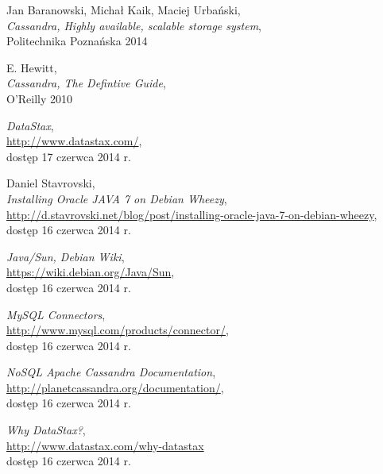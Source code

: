 \documentclass{article} %
\begin{document}
\begin{thebibliography}{10}%

Jan Baranowski, Michał Kaik, Maciej Urbański,\\
\emph{Cassandra, Highly available, scalable storage system},\\
Politechnika Poznańska 2014

E. Hewitt,\\
\emph{Cassandra, The Defintive Guide},\\
O'Reilly 2010

\emph{DataStax},\\
\url{http://www.datastax.com/},\\
dostęp 17 czerwca 2014 r.

Daniel Stavrovski,\\
\emph{Installing Oracle JAVA 7 on Debian Wheezy},\\
\url{http://d.stavrovski.net/blog/post/installing-oracle-java-7-on-debian-wheezy},\\
dostęp 16 czerwca 2014 r.

\emph{Java/Sun, Debian Wiki},\\
\url{https://wiki.debian.org/Java/Sun},\\
dostęp 16 czerwca 2014 r.

\emph{MySQL Connectors},\\
\url{http://www.mysql.com/products/connector/},\\
dostęp 16 czerwca 2014 r.

\emph{NoSQL Apache Cassandra Documentation},\\
\url{http://planetcassandra.org/documentation/},\\
dostęp 16 czerwca 2014 r.

\emph{Why DataStax?},\\
\url{http://www.datastax.com/why-datastax}\\
dostęp 16 czerwca 2014 r.

\end{thebibliography}
\end{document}

